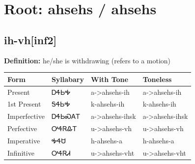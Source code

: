 \documentclass{article}%
\begin{document}
%
\normalsize%
\section*{Root: ahsehs / ahsehs}%
\subsection*{ih-vh[inf2]}%
\textbf{Definition: }%
he/she is withdrawing (refers to a motion)%
\\[0.5em]%
\begin{tabular}{|l|l|l|l|}%
\hline%
\textbf{Form}&\textbf{Syllabary}&\textbf{With Tone}&\textbf{Toneless}\\%
\hline%
Present&ᎠᏎᏏᎭ&a{-}>ahsehs{-}ih&a{-}>ahsehs{-}ih\\%
1st Present&ᎦᏎᏏᎭ&k{-}ahsehs{-}ih&k{-}ahsehs{-}ih\\%
Imperfective&ᎠᏎᏏᏍᎪᎢ&a{-}>ahsehs{-}ihsk&a{-}>ahsehs{-}ihsk\\%
Perfective&ᎤᏎᏒᎲᎢ&u{-}>ahsehs{-}vh&u{-}>ahsehs{-}vh\\%
Imperative&ᎭᏎᏌ&h{-}ahsehs{-}a&h{-}ahsehs{-}a\\%
Infinitive&ᎤᏎᏒᏗ&u{-}>ahsehs{-}vht&u{-}>ahsehs{-}vht\\%
\hline%
\end{tabular}%
\\[1em]%
\end{document}
